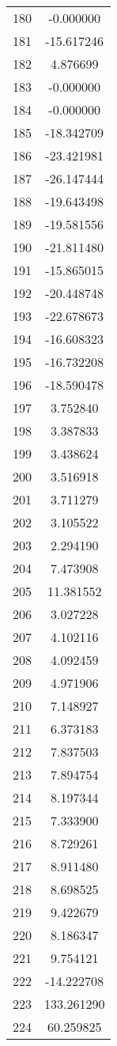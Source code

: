\documentclass[12pt]{article}
\begin{document}
\begin{longtable}{@{}cc@{}}
180 & -0.000000 \\
181 & -15.617246 \\
182 & 4.876699 \\
183 & -0.000000 \\
184 & -0.000000 \\
185 & -18.342709 \\
186 & -23.421981 \\
187 & -26.147444 \\
188 & -19.643498 \\
189 & -19.581556 \\
190 & -21.811480 \\
191 & -15.865015 \\
192 & -20.448748 \\
193 & -22.678673 \\
194 & -16.608323 \\
195 & -16.732208 \\
196 & -18.590478 \\
197 & 3.752840 \\
198 & 3.387833 \\
199 & 3.438624 \\
200 & 3.516918 \\
201 & 3.711279 \\
202 & 3.105522 \\
203 & 2.294190 \\
204 & 7.473908 \\
205 & 11.381552 \\
206 & 3.027228 \\
207 & 4.102116 \\
208 & 4.092459 \\
209 & 4.971906 \\
210 & 7.148927 \\
211 & 6.373183 \\
212 & 7.837503 \\
213 & 7.894754 \\
214 & 8.197344 \\
215 & 7.333900 \\
216 & 8.729261 \\
217 & 8.911480 \\
218 & 8.698525 \\
219 & 9.422679 \\
220 & 8.186347 \\
221 & 9.754121 \\
222 & -14.222708 \\
223 & 133.261290 \\
224 & 60.259825 \\

\end{longtable}
\end{document}
